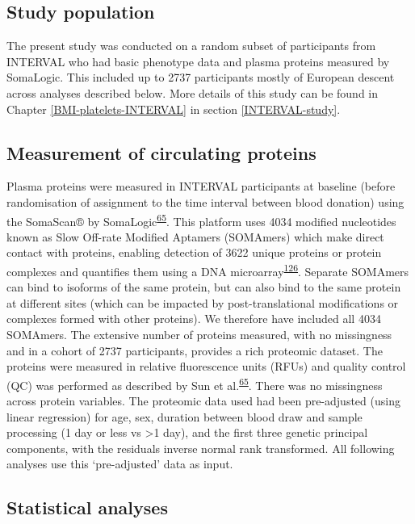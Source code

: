 \documentclass[11pt,twoside]{bristolthesis}
\begin{document}
\hypertarget{study-population-2}{%
\subsection{Study population}\label{study-population-2}}

The present study was conducted on a random subset of participants from INTERVAL who had basic phenotype data and plasma proteins measured by SomaLogic. This included up to 2737 participants mostly of European descent across analyses described below. More details of this study can be found in Chapter \ref{BMI-platelets-INTERVAL} in section \ref{INTERVAL-study}.

\hypertarget{measurement-of-circulating-proteins}{%
\subsection{Measurement of circulating proteins}\label{measurement-of-circulating-proteins}}

Plasma proteins were measured in INTERVAL participants at baseline (before randomisation of assignment to the time interval between blood donation) using the SomaScan® by SomaLogic\textsuperscript{\protect\hyperlink{ref-Sun2018}{65}}. This platform uses 4034 modified nucleotides known as Slow Off-rate Modified Aptamers (SOMAmers) which make direct contact with proteins, enabling detection of 3622 unique proteins or protein complexes and quantifies them using a DNA microarray\textsuperscript{\protect\hyperlink{ref-Rohloff2014}{126}}. Separate SOMAmers can bind to isoforms of the same protein, but can also bind to the same protein at different sites (which can be impacted by post-translational modifications or complexes formed with other proteins). We therefore have included all 4034 SOMAmers. The extensive number of proteins measured, with no missingness and in a cohort of 2737 participants, provides a rich proteomic dataset. The proteins were measured in relative fluorescence units (RFUs) and quality control (QC) was performed as described by Sun et al.\textsuperscript{\protect\hyperlink{ref-Sun2018}{65}}. There was no missingness across protein variables. The proteomic data used had been pre-adjusted (using linear regression) for age, sex, duration between blood draw and sample processing (1 day or less vs \textgreater1 day), and the first three genetic principal components, with the residuals inverse normal rank transformed. All following analyses use this `pre-adjusted' data as input.

\hypertarget{statistical-analyses}{%
\subsection{Statistical analyses}\label{statistical-analyses}}
\end{document}
